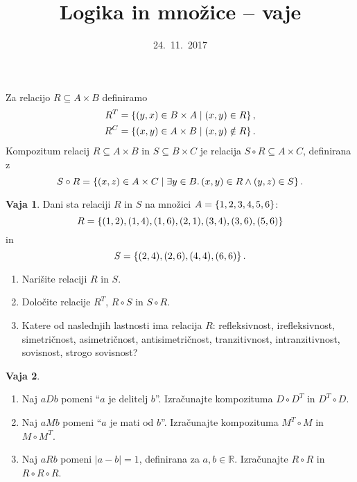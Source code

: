 \documentclass{article}
\newcommand{\some}[1]{\exists #1 .\,}
\newcommand{\RR}{\mathbb{R}}
\theoremstyle{definition}
\newtheorem{vaja}{Vaja}
\begin{document}
\title{Logika in množice -- vaje}
\date{24.~11.~2017}
\maketitle

\bigskip

\noindent
Za relacijo $R \subseteq A \times B$ definiramo
%
\begin{align*}
  R^T &= \set{(y,x) \in B \times A}{(x,y) \in R},\\
  R^C &= \set{(x,y) \in A \times B}{(x,y) \notin R}.
\end{align*}
%
Kompozitum relacij $R \subseteq A \times B$ in $S \subseteq B \times
C$ je relacija $S \circ R \subseteq A \times C$, definirana z
%
\begin{equation*}
  S \circ R = \set{(x,z) \in A \times C}{\some{y \in B}{(x,y) \in R \land (y,z) \in S}}.
\end{equation*}

\bigskip\bigskip

\begin{vaja}
  Dani sta relaciji $R$ in $S$ na množici $A = \set{1,2,3,4,5,6}$:
  \[R = \set{(1,2),(1,4),(1,6),(2,1),(3,4),(3,6),(5,6)}\]
  in
  \[S = \set{(2,4),(2,6),(4,4),(6,6)}.\]
  \begin{enumerate}
    \item
      Narišite relaciji $R$ in $S$.
    \item
      Določite relacije $R^T$, $R \circ S$ in $S \circ R$.
    \item
      Katere od naslednjih lastnosti ima relacija $R$: refleksivnost, irefleksivnost, simetričnost, asimetričnost, antisimetričnost, tranzitivnost, intranzitivnost, sovisnost, strogo sovisnost?
  \end{enumerate}
\end{vaja}

\begin{vaja}
  \
  \begin{enumerate}
    \item
      Naj $a D b$ pomeni "`$a$ je delitelj $b$"'. Izračunajte kompozituma $D \circ D^T$ in $D^T \circ D$.
    \item
      Naj $a M b$ pomeni "`$a$ je mati od $b$"'. Izračunajte kompozituma $M^T \circ M$ in $M \circ M^T$.
    \item
      Naj $a R b$ pomeni $|a - b| = 1$, definirana za $a, b \in \RR$. Izračunajte $R \circ R$ in $R \circ R \circ R$.
  \end{enumerate}
\end{vaja}
\end{document}
